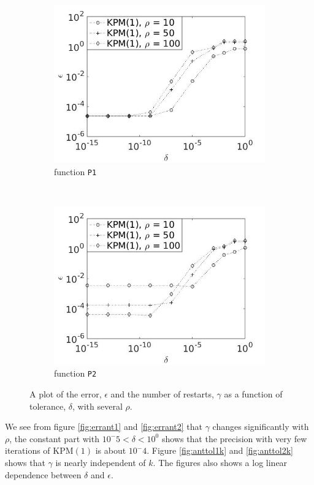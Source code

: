 \begin{figure}[H]
        \begin{subfigure}[b]{0.45\textwidth}
                \includegraphics[width=\textwidth]{fig/s15errvstol1m}
                \caption{function \texttt{P1}}
                \label{fig:errtol1}
        \end{subfigure}
~
        \begin{subfigure}[b]{0.45\textwidth}
                \includegraphics[width=\textwidth]{fig/s16errvstol2m}
                \caption{ function \texttt{P2}}
                \label{fig:errtol2}
        \end{subfigure}
        
        \caption{A plot of the error, $\epsilon$ and the number of restarts, $\gamma$ as a function of tolerance, $\delta$, with several $\rho$.} \label{fig:errant}
\end{figure}
We see from figure \ref{fig:errant1} and \ref{fig:errant2} that $\gamma$ changes significantly with $\rho$, the constant part with $ 10^-5<\delta< 10^0 $ shows that the precision with very few iterations of KPM$(1)$ is about $10^-4$. Figure \ref{fig:anttol1k} and \ref{fig:anttol2k} shows that $\gamma$ is nearly independent of $k$. The figures also shows a log linear dependence between $\delta$ and $\epsilon$. \\

